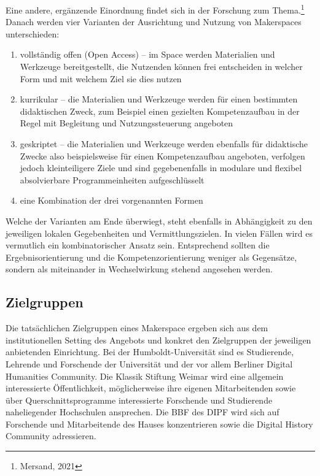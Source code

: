 \documentclass[a4paper,
fontsize=11pt,
oneside,
numbers=noperiodatend,
parskip=half-,
bibliography=totoc,
final
]{scrartcl}
\begin{document}
Eine andere, ergänzende Einordnung findet sich in der Forschung zum
Thema.\footnote{Mersand, 2021} Danach werden vier Varianten der
Ausrichtung und Nutzung von Makerspaces unterschieden:

\begin{enumerate}
\def\labelenumi{\arabic{enumi}.}
\item
  vollständig offen (Open Access) -- im Space werden Materialien und
  Werkzeuge bereitgestellt, die Nutzenden können frei entscheiden in
  welcher Form und mit welchem Ziel sie dies nutzen
\item
  kurrikular -- die Materialien und Werkzeuge werden für einen
  bestimmten didaktischen Zweck, zum Beispiel einen gezielten
  Kompetenzaufbau in der Regel mit Begleitung und Nutzungssteuerung
  angeboten
\item
  geskriptet -- die Materialien und Werkzeuge werden ebenfalls für
  didaktische Zwecke also beispielsweise für einen Kompetenzaufbau
  angeboten, verfolgen jedoch kleinteiligere Ziele und sind
  gegebenenfalls in modulare und flexibel absolvierbare
  Programmeinheiten aufgeschlüsselt
\item
  eine Kombination der drei vorgenannten Formen
\end{enumerate}

Welche der Varianten am Ende überwiegt, steht ebenfalls in Abhängigkeit
zu den jeweiligen lokalen Gegebenheiten und Vermittlungszielen. In
vielen Fällen wird es vermutlich ein kombinatorischer Ansatz sein.
Entsprechend sollten die Ergebnisorientierung und die
Kompetenzorientierung weniger als Gegensätze, sondern als miteinander in
Wechselwirkung stehend angesehen werden.

\hypertarget{zielgruppen}{%
\subsection{Zielgruppen}\label{zielgruppen}}

Die tatsächlichen Zielgruppen eines Makerspace ergeben sich aus dem
institutionellen Setting des Angebots und konkret den Zielgruppen der
jeweiligen anbietenden Einrichtung. Bei der Humboldt-Universität sind es
Studierende, Lehrende und Forschende der Universität und der vor allem
Berliner Digital Humanities Community. Die Klassik Stiftung Weimar wird
eine allgemein interessierte Öffentlichkeit, möglicherweise ihre eigenen
Mitarbeitenden sowie über Querschnittsprogramme interessierte Forschende
und Studierende naheliegender Hochschulen ansprechen. Die BBF des DIPF
wird sich auf Forschende und Mitarbeitende des Hauses konzentrieren
sowie die Digital History Community adressieren.
\end{document}
